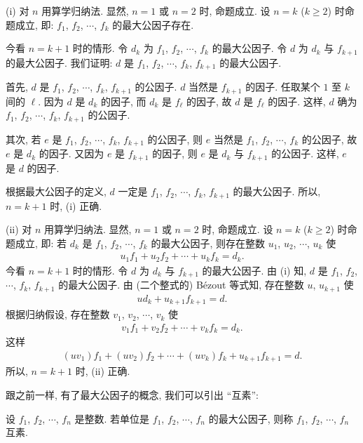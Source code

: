 \begin{pf}
    (i) 对 $n$ 用算学归纳法. 显然, $n = 1$ 或 $n = 2$ 时, 命题成立. 设 $n = k$ ($k \geq 2$) 时命题成立, 即: $f_1$, $f_2$, $\cdots$, $f_k$ 的最大公因子存在.

    今看 $n = k+1$ 时的情形. 令 $d_k$ 为 $f_1$, $f_2$, $\cdots$, $f_k$ 的最大公因子. 令 $d$ 为 $d_k$ 与 $f_{k+1}$ 的最大公因子. 我们证明: $d$ 是 $f_1$, $f_2$, $\cdots$, $f_k$, $f_{k+1}$ 的最大公因子.

    首先, $d$ 是 $f_1$, $f_2$, $\cdots$, $f_k$, $f_{k+1}$ 的公因子. $d$ 当然是 $f_{k+1}$ 的因子. 任取某个 $1$ 至 $k$ 间的 $\ell$. 因为 $d$ 是 $d_k$ 的因子, 而 $d_k$ 是 $f_{\ell}$ 的因子, 故 $d$ 是 $f_{\ell}$ 的因子. 这样, $d$ 确为 $f_1$, $f_2$, $\cdots$, $f_k$, $f_{k+1}$ 的公因子.

    其次, 若 $e$ 是 $f_1$, $f_2$, $\cdots$, $f_k$, $f_{k+1}$ 的公因子, 则 $e$ 当然是 $f_1$, $f_2$, $\cdots$, $f_{k}$ 的公因子, 故 $e$ 是 $d_k$ 的因子. 又因为 $e$ 是 $f_{k+1}$ 的因子, 则 $e$ 是 $d_k$ 与 $f_{k+1}$ 的公因子. 这样, $e$ 是 $d$ 的因子.

    根据最大公因子的定义, $d$ 一定是 $f_1$, $f_2$, $\cdots$, $f_k$, $f_{k+1}$ 的最大公因子. 所以, $n = k+1$ 时, (i) 正确.

    (ii) 对 $n$ 用算学归纳法. 显然, $n = 1$ 或 $n = 2$ 时, 命题成立. 设 $n = k$ ($k \geq 2$) 时命题成立, 即: 若 $d_k$ 是 $f_1$, $f_2$, $\cdots$, $f_k$ 的最大公因子, 则存在整数 $u_1$, $u_2$, $\cdots$, $u_k$ 使
    \begin{align*}
        u_1 f_1 + u_2 f_2 + \cdots + u_k f_k = d_k.
    \end{align*}
    今看 $n = k+1$ 时的情形. 令 $d$ 为 $d_k$ 与 $f_{k+1}$ 的最大公因子. 由 (i) 知, $d$ 是 $f_1$, $f_2$, $\cdots$, $f_k$, $f_{k+1}$ 的最大公因子. 由 (二个整式的) Bézout 等式知, 存在整数 $u$, $u_{k+1}$ 使
    \begin{align*}
        u d_k + u_{k+1} f_{k+1} = d.
    \end{align*}
    根据归纳假设, 存在整数 $v_1$, $v_2$, $\cdots$, $v_k$ 使
    \begin{align*}
        v_1 f_1 + v_2 f_2 + \cdots + v_k f_k = d_k.
    \end{align*}
    这样
    \begin{align*}
        (uv_1) f_1 + (uv_2) f_2 + \cdots + (uv_k) f_k + u_{k+1} f_{k+1} = d.
    \end{align*}
    所以, $n = k+1$ 时, (ii) 正确.
\end{pf}

跟之前一样, 有了最大公因子的概念, 我们可以引出 ``互素'':
\begin{definition}
    设 $f_1$, $f_2$, $\cdots$, $f_n$ 是整数. 若单位是 $f_1$, $f_2$, $\cdots$, $f_n$ 的最大公因子, 则称 $f_1$, $f_2$, $\cdots$, $f_n$ 互素.
\end{definition}


